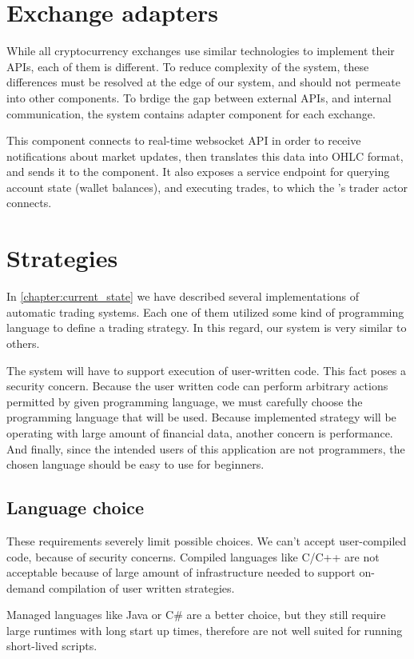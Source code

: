 \section{Exchange adapters}
While all cryptocurrency exchanges use similar technologies to implement their APIs, each of them is different. To reduce
complexity of the system, these differences must be resolved at the edge of our system, and should not permeate into other
components. To brdige the gap between external APIs, and internal communication, the system contains adapter component
for each exchange.

This component connects to real-time websocket API in order to receive notifications about market updates,
then translates this data into OHLC format, and sends it to the  component.
It also exposes a service endpoint for querying account state (wallet balances), and executing trades, to which the
's trader actor connects.

\section{Strategies}
In \autoref{chapter:current_state} we have described several implementations of automatic trading systems. Each one of them
utilized some kind of programming language to define a trading strategy. In this regard, our system is very similar to others.

The system will have to support execution of user-written code. This fact poses a security concern. Because the user
written code can perform arbitrary actions permitted by given programming language, we must carefully choose the programming
language that will be used. Because implemented strategy will be operating with large amount of financial data, another
concern is performance. And finally, since the intended users of this application are not programmers, the chosen language
should be easy to use for beginners.

\subsection{Language choice}
These requirements severely limit possible choices. We can't accept user-compiled code, because of security concerns.
Compiled languages like C/C++ are not acceptable because of large amount of infrastructure needed to support
on-demand compilation of user written strategies.

Managed languages like Java or C\# are a better choice, but they still require large runtimes with long start up times, therefore
are not well suited for running short-lived scripts.

